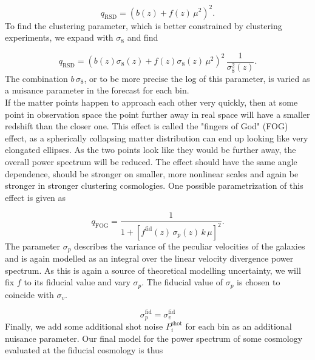 \documentclass[../main.tex]{subfiles}
\begin{document}
\begin{equation}
    q_\mathrm{RSD} = \left(b(z) + f(z)\,\mu^2 \right)^2.
\end{equation}
To find the clustering parameter, which is better constrained by clustering experiments, we expand with $\sigma_8$ and find 

\begin{equation*}
    q_\mathrm{RSD} = \left(b(z) \sigma_8(z) + f(z) \sigma_8(z) \,\mu^2 \right)^2\,\frac{1}{\sigma_8^2(z)}.
\end{equation*}
The combination $b\,\sigma_8$, or to be more precise the log of this parameter, is varied as a nuisance parameter in the forecast for each bin.\\
If the matter points happen to approach each other very quickly, then at some point in observation space the point further away in real space will have a smaller redshift than the closer one. This effect is called the "fingers of God" (FOG) effect, as a spherically collapsing matter distribution can end up looking like very elongated ellipses. As the two points look like they would be further away, the overall power spectrum will be reduced. The effect should have the same angle dependence, should be stronger on smaller, more nonlinear scales and again be stronger in stronger clustering cosmologies. One possible parametrization of this effect is given as 

\begin{equation}
q_\mathrm{FOG} = \frac{1}{1+\left[f^\mathrm{fid}(z)\,\sigma_p(z)\,k\,\mu\right]^2}.   
\end{equation}
The parameter $\sigma_p$ describes the variance of the peculiar velocities of the galaxies and is again modelled as an integral over the linear velocity divergence power spectrum. As this is again a source of theoretical modelling uncertainty, we will fix $f$ to its fiducial value and vary $\sigma_p$. The fiducial value of $\sigma_p$ is chosen to coincide with $\sigma_v$.

\begin{equation}
    \sigma_p^\mathrm{fid} = \sigma_v^\mathrm{fid}
\end{equation}
Finally, we add some additional shot noise $P^\mathrm{shot}_i$ for each bin as an additional nuisance parameter. Our final model for the power spectrum of some cosmology evaluated at the fiducial cosmology is thus
\end{document}
